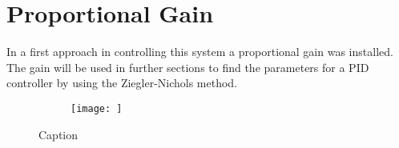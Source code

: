 \section{Proportional Gain}
In a first approach in controlling this system a proportional gain was installed. The gain will be used in further sections to find the parameters for a PID controller by using the Ziegler-Nichols method.
\begin{figure}
    \centering
    \begin{subfigure}{0.45\textwidth}
        \texttt{[image: ]}
    \end{subfigure}    
    \caption{Caption}
    \label{fig:my_label}
\end{figure}